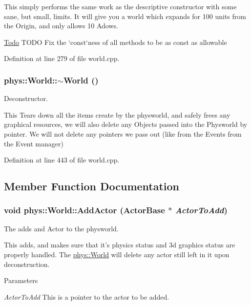 This simply performs the same work as the descriptive constructor with some sane, but small, limits. It will give you a world which expands for 100 units from the Origin, and only allows 10 Adows.

\begin{Desc}
\item[\hyperlink{todo__todo000016}{Todo}]TODO Fix the `const`ness of all methods to be as const as allowable \end{Desc}


Definition at line 279 of file world.cpp.

\hypertarget{classphys_1_1World_a8b2c74c7e5d5ce3c46a814e183a7aff1}{
\subsubsection[{$\sim$World}]{\setlength{\rightskip}{0pt plus 5cm}phys::World::$\sim$World ()}}
\label{da/ddf/classphys_1_1World_a8b2c74c7e5d5ce3c46a814e183a7aff1}


Deconstructor. 

This Tears down all the items create by the physworld, and safely frees any graphical resources, we will also delete any Objects passed into the Physworld by pointer. We will not delete any pointers we pass out (like from the Events from the Event manager) 

Definition at line 443 of file world.cpp.



\subsection{Member Function Documentation}
\hypertarget{classphys_1_1World_a0fec41ef68b7bb1443aab927f8277a81}{
\subsubsection[{AddActor}]{\setlength{\rightskip}{0pt plus 5cm}void phys::World::AddActor ({\bf ActorBase} $\ast$ {\em ActorToAdd})}}
\label{da/ddf/classphys_1_1World_a0fec41ef68b7bb1443aab927f8277a81}


The adds and Actor to the physworld. 

This adds, and makes sure that it's physics status and 3d graphics status are properly handled. The \hyperlink{classphys_1_1World}{phys::World} will delete any actor still left in it upon deconstruction. 
\begin{DoxyParams}{Parameters}
\item[{\em ActorToAdd}]This is a pointer to the actor to be added. \end{DoxyParams}



